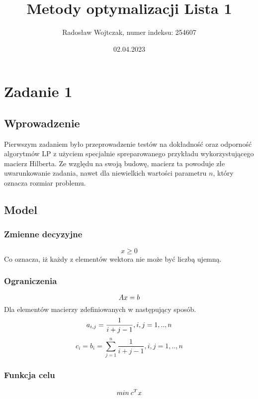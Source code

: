 \documentclass[a4paper,14pt]{report}
\title{Metody optymalizacji Lista 1}
\author{Radosław Wojtczak, numer indeksu: 254607}
\date{02.04.2023}
\begin{document}
\maketitle
\tableofcontents
\chapter{Zadanie 1}
\section{Wprowadzenie}
    Pierwszym zadaniem było przeprowadzenie testów na dokładność oraz odporność
    algorytmów LP z użyciem specjalnie spreparowanego przykładu wykorzystującego
    macierz Hilberta.
    Ze względu na swoją budowę, macierz ta
    powoduje złe uwarunkowanie zadania, nawet dla niewielkich wartości parametru
    $n$, który oznacza rozmiar problemu.
\section{Model}
    \subsection{Zmienne decyzyjne}
        \begin{equation}
            x \geq 0
        \end{equation}
        Co oznacza, iż każdy z elementów wektora nie może być liczbą ujemną.
    \subsection{Ograniczenia}
        \begin{equation}
            A \boldmath x = b
        \end{equation}
        Dla elementów macierzy zdefiniowanych w następujący sposób.
        \begin{equation}
            a_{i,j} = \frac{1}{i+j-1}, i,j=1,..,n \\
        \end{equation}
        \begin{equation}
            c_{i} = b_{i} =\sum_{j=1}^{n} \frac{1}{i+j-1}, i,j=1,..,n
        \end{equation}
    \subsection{Funkcja celu}
        \begin{equation}
            min \: \boldmath c^{T}x
        \end{equation}
\end{document}
